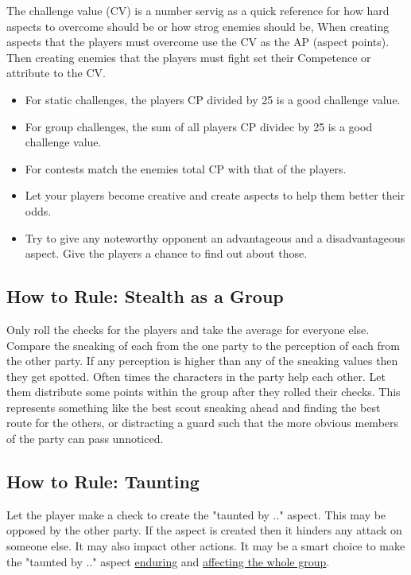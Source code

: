 \documentclass[11pt]{article}
\begin{document}
{The challenge value (CV) is a number servig as a quick reference for how hard aspects to overcome should be or how strog enemies should be, When creating aspects that the players must overcome use the CV as the AP (aspect points). Then creating enemies that the players must fight set their Competence or attribute to the CV.
\begin{itemize}
\item For static challenges, the players CP divided by 25 is a good challenge value.
\item For group challenges, the sum of all players CP dividec by 25 is a good challenge value.
\item For contests match the enemies total CP with that of the players.
\item Let your players become creative and create aspects to help them better their odds.
\item Try to give any noteworthy opponent an advantageous and a disadvantageous aspect. Give the players a chance to find out about those.
\end{itemize}

\subsection{How to Rule: Stealth as a Group}
\label{sec:org7a363e5}

Only roll the checks for the players and take the average for everyone else. Compare the sneaking of each from the one party to the perception of each from the other party. If any perception is higher than any of the sneaking values then they get spotted.
Often times the characters in the party help each other. Let them distribute some points within the group after they rolled their checks. This represents something like the best scout sneaking ahead and finding the best route for the others, or distracting a guard such that the more obvious members of the party can pass unnoticed.

\subsection{How to Rule: Taunting}
\label{sec:orge6bab08}
Let the player make a check to create the "taunted by .." aspect. This may be opposed by the other party. If the aspect is created then it hinders any attack on someone else. It may also impact other actions. It may be a smart choice to make the "taunted by .." aspect \hyperref[sec:org38549a6]{enduring} and \hyperref[sec:org42799a8]{affecting the whole group}. 

}
\end{document}
